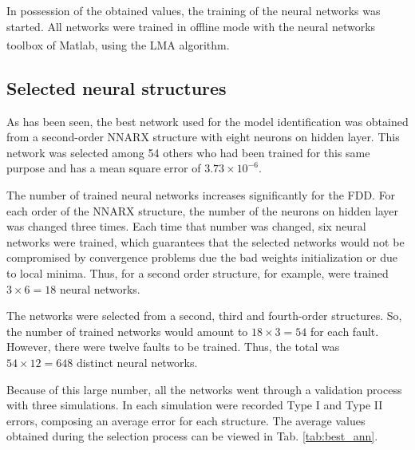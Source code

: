 \documentclass[10pt,fleqn,a4paper]{article}
\newcommand{\reg}{\textsuperscript{\textregistered}}
\begin{document}
In possession of the obtained values, the training of the neural networks was
started. All networks were trained in offline mode with the neural networks
toolbox of Matlab\reg, using the LMA algorithm.

\subsection{Selected neural structures}
As has been seen, the best network used for the model identification was obtained
from a second-order NNARX structure with eight neurons on hidden layer. This
network was selected among 54 others who had been trained for this same purpose
and has a mean square error of $3.73 \times 10^{-6}$.

The number of trained neural networks increases significantly for the FDD. For
each order of the NNARX structure, the number of the neurons on hidden layer was
changed three times. Each time that number was changed, six neural networks were
trained, which guarantees that the selected networks would not be compromised by
convergence problems due the bad weights initialization or due to local minima.
Thus, for a second order structure, for example, were trained $3 \times 6 = 18$
neural networks.

The networks were selected from a second, third and fourth-order structures. So,
the number of trained networks would amount to $18 \times 3 = 54$ for each
fault. However, there were twelve faults to be trained. Thus, the total was $54
\times 12 = 648$ distinct neural networks.

Because of this large number, all the networks went through a validation process
with three simulations. In each simulation were recorded Type I and Type II
errors, composing an average error for each structure. The average values
obtained during the selection process can be viewed in Tab. \ref{tab:best_ann}.
\end{document}
